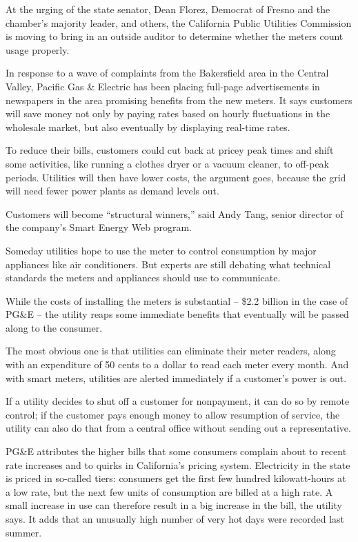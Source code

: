 ﻿\documentclass[12pt]{article}
\begin{document}
At the urging of the state senator, Dean Florez, Democrat of Fresno and the chamber's majority
leader, and others, the California Public Utilities Commission is moving to bring in an outside
auditor to determine whether the meters count usage properly.

In response to a wave of complaints from the Bakersfield area in the Central Valley, Pacific Gas \&
Electric has been placing full-page advertisements in newspapers in the area promising benefits from
the new meters. It says customers will save money not only by paying rates based on hourly
fluctuations in the wholesale market, but also eventually by displaying real-time rates.

To reduce their bills, customers could cut back at pricey peak times and shift some activities, like
running a clothes dryer or a vacuum cleaner, to off-peak periods. Utilities will then have lower
costs, the argument goes, because the grid will need fewer power plants as demand levels out.

Customers will become ``structural winners,'' said Andy Tang, senior director of the company's Smart
Energy Web program.

Someday utilities hope to use the meter to control consumption by major appliances like air
conditioners. But experts are still debating what technical standards the meters and appliances
should use to communicate.

While the costs of installing the meters is substantial -- \$2.2 billion in the case of PG\&E -- the
utility reaps some immediate benefits that eventually will be passed along to the consumer.

The most obvious one is that utilities can eliminate their meter readers, along with an expenditure
of 50 cents to a dollar to read each meter every month. And with smart meters, utilities are alerted
immediately if a customer's power is out.

If a utility decides to shut off a customer for nonpayment, it can do so by remote control; if the
customer pays enough money to allow resumption of service, the utility can also do that from a
central office without sending out a representative.

PG\&E attributes the higher bills that some consumers complain about to recent rate increases and to
quirks in California's pricing system. Electricity in the state is priced in so-called tiers:
consumers get the first few hundred kilowatt-hours at a low rate, but the next few units of
consumption are billed at a high rate. A small increase in use can therefore result in a big
increase in the bill, the utility says. It adds that an unusually high number of very hot days were
recorded last summer.
\end{document}
